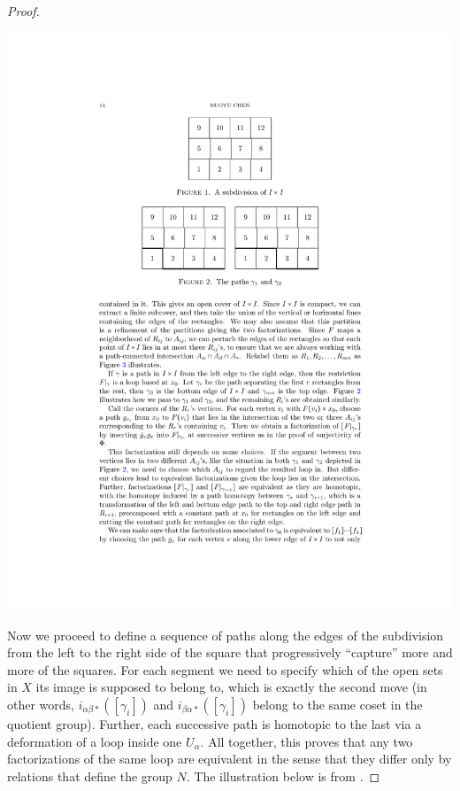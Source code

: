 \begin{proof}
    \begin{center}
        \includegraphics[scale=1]{figures/subdivision.pdf}
    \end{center}

    Now we proceed to define a sequence of paths along the edges of the subdivision from the left to the right side of the square that progressively ``capture'' more and more of the squares. For each segment we need to specify which of the open sets in $X$ its image is supposed to belong to, which is exactly the second move (in other words, $i_{\alpha\beta\ast}([\gamma_i])$ and $i_{\beta\alpha\ast}([\gamma_i])$ belong to the same coset in the quotient group). Further, each successive path is homotopic to the last via a deformation of a loop inside one $U_\alpha$. All together, this proves that any two factorizations of the same loop are equivalent in the sense that they differ only by relations that define the group $N$. The illustration below is from \cite[Chapter 10]{LeeTop}.


\end{proof}
